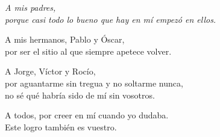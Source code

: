 \vspace*{\fill}
\begin{flushright}
    \itshape
    A mis padres,\\
    porque casi todo lo bueno que hay en mí empezó en ellos.

    \medskip
    A mis hermanos, Pablo y Óscar,\\
    por ser el sitio al que siempre apetece volver.

    \medskip
    A Jorge, Víctor y Rocío,\\
    por aguantarme sin tregua y no soltarme nunca,\\
    no sé qué habría sido de mí sin vosotros.

    \medskip
    A todos, por creer en mí cuando yo dudaba.\\
    Este logro también es vuestro.
    \upshape
\end{flushright}
\vspace*{\fill}
